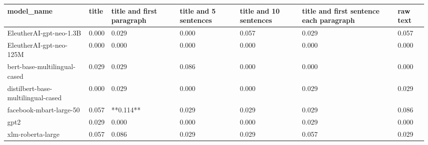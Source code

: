 \begin{tabular}{lllllll}
\toprule
                        model\_name & title & title and first paragraph & title and 5 sentences & title and 10 sentences & title and first sentence each paragraph & raw text \\
\midrule
           EleutherAI-gpt-neo-1.3B & 0.000 &                     0.029 &                 0.000 &                  0.057 &                                   0.029 &    0.057 \\
           EleutherAI-gpt-neo-125M & 0.000 &                     0.000 &                 0.000 &                  0.000 &                                   0.000 &    0.000 \\
      bert-base-multilingual-cased & 0.029 &                     0.029 &                 0.086 &                  0.000 &                                   0.000 &    0.000 \\
distilbert-base-multilingual-cased & 0.000 &                     0.029 &                 0.000 &                  0.000 &                                   0.029 &    0.029 \\
           facebook-mbart-large-50 & 0.057 &                 **0.114** &                 0.029 &                  0.029 &                                   0.029 &    0.086 \\
                              gpt2 & 0.029 &                     0.000 &                 0.000 &                  0.000 &                                   0.029 &    0.000 \\
                 xlm-roberta-large & 0.057 &                     0.086 &                 0.029 &                  0.029 &                                   0.057 &    0.029 \\
\bottomrule
\end{tabular}
